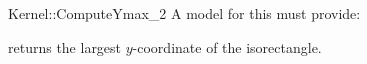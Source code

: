 \begin{ccRefFunctionObjectConcept}{Kernel::ComputeYmax_2}
A model for this must provide:


       {returns the largest $y$-coordinate of the isorectangle.}


\ccRefines
{}



\end{ccRefFunctionObjectConcept}
